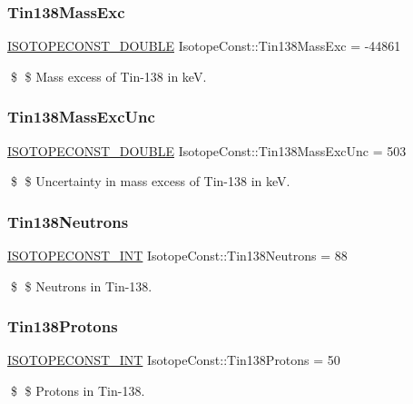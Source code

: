 \subsubsection{\texorpdfstring{Tin138\+Mass\+Exc}{Tin138MassExc}}
{\footnotesize\ttfamily \mbox{\hyperlink{group___isotope_const-_macros_ga8f45a7272ce02c0b4c65c44636ed719a}{I\+S\+O\+T\+O\+P\+E\+C\+O\+N\+S\+T\+\_\+\+D\+O\+U\+B\+LE}} Isotope\+Const\+::\+Tin138\+Mass\+Exc = -\/44861}

\$ \$ Mass excess of Tin-\/138 in keV. \mbox{\label{group___isotope_const-_tin-_sn138_ga37e056067b7df700dd9cd0d68f252ee1}} 
\subsubsection{\texorpdfstring{Tin138\+Mass\+Exc\+Unc}{Tin138MassExcUnc}}
{\footnotesize\ttfamily \mbox{\hyperlink{group___isotope_const-_macros_ga8f45a7272ce02c0b4c65c44636ed719a}{I\+S\+O\+T\+O\+P\+E\+C\+O\+N\+S\+T\+\_\+\+D\+O\+U\+B\+LE}} Isotope\+Const\+::\+Tin138\+Mass\+Exc\+Unc = 503}

\$ \$ Uncertainty in mass excess of Tin-\/138 in keV. \mbox{\label{group___isotope_const-_tin-_sn138_ga0aa0f391d07f0005748550ed740dc886}} 
\subsubsection{\texorpdfstring{Tin138\+Neutrons}{Tin138Neutrons}}
{\footnotesize\ttfamily \mbox{\hyperlink{group___isotope_const-_macros_ga5f18360b3e99483a35c32d789e62621c}{I\+S\+O\+T\+O\+P\+E\+C\+O\+N\+S\+T\+\_\+\+I\+NT}} Isotope\+Const\+::\+Tin138\+Neutrons = 88}

\$ \$ Neutrons in Tin-\/138. \mbox{\label{group___isotope_const-_tin-_sn138_gaa682d4ebb9faef67c68104fb123e0b72}} 
\subsubsection{\texorpdfstring{Tin138\+Protons}{Tin138Protons}}
{\footnotesize\ttfamily \mbox{\hyperlink{group___isotope_const-_macros_ga5f18360b3e99483a35c32d789e62621c}{I\+S\+O\+T\+O\+P\+E\+C\+O\+N\+S\+T\+\_\+\+I\+NT}} Isotope\+Const\+::\+Tin138\+Protons = 50}

\$ \$ Protons in Tin-\/138. 